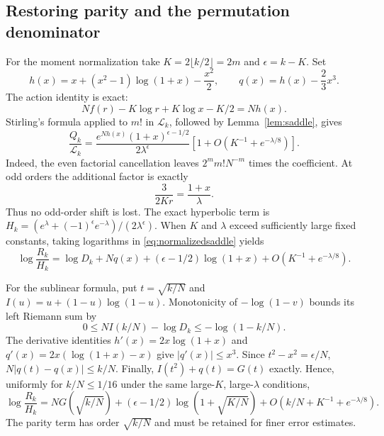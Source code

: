 \documentclass[11pt]{article}
\theoremstyle{definition}
\theoremstyle{remark}
\newcommand{\1}{\mathbf 1}
\begin{document}
\subsection{Restoring parity and the permutation denominator}

For the moment normalization take $K=2\lfloor k/2\rfloor=2m$ and $\epsilon=k-K$. Set
\begin{equation}\label{eq:actionq}
h(x)=x+(x^2-1)\log(1+x)-\frac{x^2}{2},\qquad
q(x)=h(x)-\frac23x^3.
\end{equation}
The action identity is exact:
\[
Nf(r)-K\log r+K\log x-K/2=Nh(x).
\]
Stirling's formula applied to $m!$ in $\mathcal L_k$, followed by Lemma~\ref{lem:saddle}, gives
\begin{equation}\label{eq:normalizedsaddle}
\frac{Q_k}{\mathcal L_k}
=\frac{e^{Nh(x)}(1+x)^{\epsilon-1/2}}{2\lambda^\epsilon}
\left[1+O\left(K^{-1}+e^{-\lambda/8}\right)\right].
\end{equation}
Indeed, the even factorial cancellation leaves $2^mm!N^{-m}$ times the coefficient. At odd orders the additional factor is exactly
\[
\frac3{2Kr}=\frac{1+x}{\lambda}.
\]
Thus no odd-order shift is lost. The exact hyperbolic term is
$H_k=(e^\lambda+(-1)^\epsilon e^{-\lambda})/(2\lambda^\epsilon)$.
When $K$ and $\lambda$ exceed sufficiently large fixed constants, taking logarithms in \eqref{eq:normalizedsaddle} yields
\begin{equation}\label{eq:logsaddle}
\log\frac{R_k}{H_k}
=\log D_k+Nq(x)+(\epsilon-1/2)\log(1+x)
+O\left(K^{-1}+e^{-\lambda/8}\right).
\end{equation}

For the sublinear formula, put $t=\sqrt{k/N}$ and
$I(u)=u+(1-u)\log(1-u)$. Monotonicity of $-\log(1-v)$ bounds its left Riemann sum by
\begin{equation}\label{eq:denominatorintegral}
0\le NI(k/N)-\log D_k\le-\log(1-k/N).
\end{equation}
The derivative identities
$h'(x)=2x\log(1+x)$ and $q'(x)=2x(\log(1+x)-x)$ give $|q'(x)|\le x^3$. Since $t^2-x^2=\epsilon/N$,
$N|q(t)-q(x)|\le k/N$. Finally, $I(t^2)+q(t)=G(t)$ exactly. Hence, uniformly for $k/N\le1/16$ under the same large-$K$, large-$\lambda$ conditions,
\begin{equation}\label{eq:logsublinear}
\log\frac{R_k}{H_k}
=NG(\sqrt{k/N})+(\epsilon-1/2)\log(1+\sqrt{K/N})
+O\left(k/N+K^{-1}+e^{-\lambda/8}\right).
\end{equation}
The parity term has order $\sqrt{k/N}$ and must be retained for finer error estimates.
\end{document}
